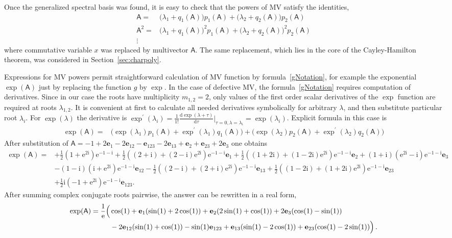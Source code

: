 \documentclass[AMA,STIX1COL]{WileyNJD-v2}
\def\m#1{\mathsf{#1}} %
\newcommand{\ii}{\mathrm{i}}
\newcommand{\ee}{\mathrm{e}} %
\newcommand{\dd}{\mathrm{d}} %
\def\m#1{\mathsf{#1}}%
\def\e#1{\mathbf{e}_{#1}} %
\begin{document}
\begin{eexample}
Once the generalized spectral basis was found, it is easy to check that the powers of MV satisfy the identities,
\begin{align*}
  \m{A}=&\bigl(\lambda_1+q_1(\m{A})\bigr) p_1(\m{A})+\bigl(\lambda_2+q_2(\m{A})\bigr) p_2(\m{A})\\
  \m{A}^2=&\bigl(\lambda_1+q_1(\m{A})\bigr)^2 p_1(\m{A})+\bigl(\lambda_2+q_2(\m{A})\bigr)^2 p_2(\m{A})\\
  \vdots&
\end{align*}
where  commutative variable $x$ was replaced by multivector  $\m{A}$.
The same replacement, which lies in the core of the Cayley-Hamilton theorem, was considered in Section~\ref{sec:charpoly}.

 Expressions for MV powers permit straightforward calculation of MV function  by formula~\eqref{gNotation}, for example
 the exponential $\exp(\m{A})$ just by replacing the function $g$ by $\exp$. In the case of defective MV,
 the formula~\eqref{gNotation} requires computation of derivatives.
 Since in our case the roots have multiplicity $m_{1,2}=2$, only values of the  first order scalar derivatives of the $\exp$
 function are required at roots $\lambda_{1,2}$. It is convenient at first to calculate all needed derivatives
 symbolically for arbitrary $\lambda$, and then substitute particular root $\lambda_i$.
 For $\exp(\lambda)$ the derivative is
  $\exp^\prime(\lambda_{i})=\frac{1}{1!} \frac{\dd\exp(\lambda+\tau)}{\dd \tau}\vert_{\tau=0,\lambda=\lambda_{i}}=\exp(\lambda_{i})$.
 Explicit formula in this case is
 \begin{align*}
   \exp(\m{A})=&\bigl(\exp(\lambda_1) p_1(\m{A})+\exp^\prime(\lambda_{1})q_1(\m{A})\bigr) +\bigl(\exp(\lambda_2) p_2(\m{A})+\exp^\prime(\lambda_{2})q_2(\m{A})\bigr)
\end{align*}
After substitution of $\m{A}=-1+2 \e{1}-2 \e{12}-\e{123}-2\e{13}+\e{2}+\e{23}+2 \e{3}$ one obtains
\begin{align*}
  \exp(\m{A})=&+\frac{1}{2} \left(1+\ee^{2 \ii}\right) \ee^{-1-\ii}+\frac{1}{2} \left((2+\ii)+(2-\ii) \ee^{2 \ii}\right) \ee^{-1-\ii} \e{1}+\frac{1}{2} \left((1+2 \ii)+(1-2 \ii) \ee^{2 \ii}\right) \ee^{-1-\ii} \e{2}+(1+\ii) \left(\ee^{2 \ii}-\ii\right) \ee^{-1-\ii} \e{3}
  \\&
-(1-\ii) \left(\ii+\ee^{2 \ii}\right) \ee^{-1-\ii} \e{12}-\frac{1}{2}
   \left((2-\ii)+(2+\ii) \ee^{2 \ii}\right) \ee^{-1-\ii} \e{13}+\frac{1}{2} \left((1-2 \ii)+(1+2 \ii) \ee^{2 \ii}\right)
   \ee^{-1-\ii} \e{23}\\&
+\frac{1}{2} \ii \left(-1+\ee^{2 \ii}\right) \ee^{-1-\ii} \e{123}.
\end{align*}
After summing complex conjugate roots pairwise, the answer can be rewritten in a real form,
  \begin{align*}
    \exp(\m{A})=\frac{1}{\ee}\Bigl(&
    \cos (1) + \e{1} (\sin (1)+2 \cos (1)) +\e{2} (2 \sin (1)+\cos (1)) +2 \e{3} (\cos (1)-\sin (1))\\&
    -2 \e{12} (\sin (1)+\cos (1))-\sin (1) \e{123}+\e{13} (\sin (1)-2 \cos (1))+\e{23} (\cos (1)-2 \sin (1))
    \Bigr)\,.
  \end{align*}


\end{eexample}
\end{document}
